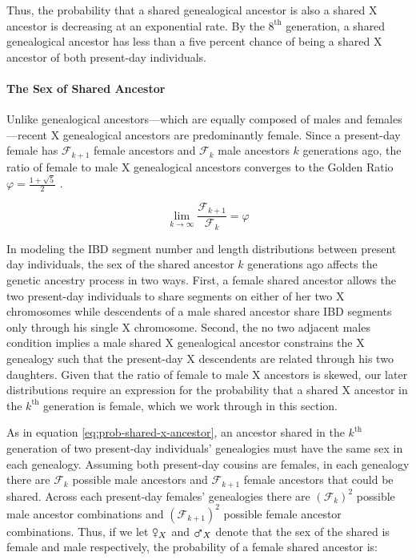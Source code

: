 \documentclass[11pt]{article}
\newcommand{\msxa}{\mars_X}
\newcommand{\fsxa}{\venus_X}
\begin{document}
Thus, the probability that a shared genealogical ancestor is also a shared X
ancestor is decreasing at an exponential rate. By the $8^\text{th}$ generation,
a shared genealogical ancestor has less than a five percent chance of being a
shared X ancestor of both present-day individuals.

\paragraph{The Sex of Shared Ancestor}
\label{p:sex-of-shared-ancestor}

Unlike genealogical ancestors---which are equally composed of males and
females---recent X genealogical ancestors are predominantly female. Since a
present-day female has $\mathcal{F}_{k+1}$ female ancestors and
$\mathcal{F}_{k}$ male ancestors $k$ generations ago, the ratio of female to
male X genealogical ancestors converges to the Golden Ratio $\varphi = \frac{1
+ \sqrt{5}}{2}$ \citep{simson1753explication}.

\begin{equation}
  \lim_{k \to \infty} \frac{\mathcal{F}_{k+1}}{\mathcal{F}_k} = \varphi
\end{equation}

In modeling the IBD segment number and length distributions between present day
individuals, the sex of the shared ancestor $k$ generations ago affects the
genetic ancestry process in two ways. First, a female shared ancestor allows
the two present-day individuals to share segments on either of her two X
chromosomes while descendents of a male shared ancestor share IBD segments only
through his single X chromosome. Second, the no two adjacent males condition
implies a male shared X genealogical ancestor constrains the X genealogy such
that the present-day X descendents are related through his two daughters.
Given that the ratio of female to male X ancestors is skewed, our later
distributions require an expression for the probability that a shared X
ancestor in the $k^\text{th}$ generation is female, which we work through in
this section.

As in equation \eqref{eq:prob-shared-x-ancestor}, an ancestor shared in the
$k^\text{th}$ generation of two present-day individuals' genealogies must have
the same sex in each genealogy. Assuming both present-day cousins are females,
in each genealogy there are $\mathcal{F}_k$ possible male ancestors and
$\mathcal{F}_{k+1}$ female ancestors that could be shared. Across each
present-day females' genealogies there are $(\mathcal{F}_k)^2$ possible male
ancestor combinations and $(\mathcal{F}_{k+1})^2$ possible female ancestor
combinations. Thus, if we let $\fsxa$ and $\msxa$ denote that the sex of the
shared is female and male respectively, the probability of a female shared
ancestor is: 
\end{document}
